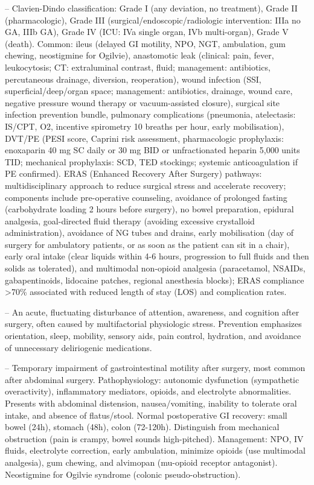 -- Clavien-Dindo classification: Grade I (any deviation, no treatment), Grade II (pharmacologic), Grade III (surgical/endoscopic/radiologic intervention: IIIa no GA, IIIb GA), Grade IV (ICU: IVa single organ, IVb multi-organ), Grade V (death). Common: ileus (delayed GI motility, NPO, NGT, ambulation, gum chewing, neostigmine for Ogilvie), anastomotic leak (clinical: pain, fever, leukocytosis; CT: extraluminal contrast, fluid; management: antibiotics, percutaneous drainage, diversion, reoperation), wound infection (SSI, superficial/deep/organ space; management: antibiotics, drainage, wound care, negative pressure wound therapy or vacuum-assisted closure), surgical site infection prevention bundle, pulmonary complications (pneumonia, atelectasis: IS/CPT, O2, incentive spirometry 10 breaths per hour, early mobilisation), DVT/PE (PESI score, Caprini risk assessment, pharmacologic prophylaxis: enoxaparin 40 mg SC daily or 30 mg BID or unfractionated heparin 5,000 units TID; mechanical prophylaxis: SCD, TED stockings; systemic anticoagulation if PE confirmed). ERAS (Enhanced Recovery After Surgery) pathways: multidisciplinary approach to reduce surgical stress and accelerate recovery; components include pre-operative counseling, avoidance of prolonged fasting (carbohydrate loading 2 hours before surgery), no bowel preparation, epidural analgesia, goal-directed fluid therapy (avoiding excessive crystalloid administration), avoidance of NG tubes and drains, early mobilisation (day of surgery for ambulatory patients, or as soon as the patient can sit in a chair), early oral intake (clear liquids within 4-6 hours, progression to full fluids and then solids as tolerated), and multimodal non-opioid analgesia (paracetamol, NSAIDs, gabapentinoids, lidocaine patches, regional anesthesia blocks); ERAS compliance >70\% associated with reduced length of stay (LOS) and complication rates.

-- An acute, fluctuating disturbance of attention, awareness, and cognition after surgery, often caused by multifactorial physiologic stress. Prevention emphasizes orientation, sleep, mobility, sensory aids, pain control, hydration, and avoidance of unnecessary deliriogenic medications.

-- Temporary impairment of gastrointestinal motility after surgery, most common after abdominal surgery. Pathophysiology: autonomic dysfunction (sympathetic overactivity), inflammatory mediators, opioids, and electrolyte abnormalities. Presents with abdominal distension, nausea/vomiting, inability to tolerate oral intake, and absence of flatus/stool. Normal postoperative GI recovery: small bowel (24h), stomach (48h), colon (72-120h). Distinguish from mechanical obstruction (pain is crampy, bowel sounds high-pitched). Management: NPO, IV fluids, electrolyte correction, early ambulation, minimize opioids (use multimodal analgesia), gum chewing, and alvimopan (mu-opioid receptor antagonist). Neostigmine for Ogilvie syndrome (colonic pseudo-obstruction).

